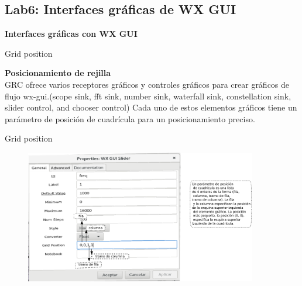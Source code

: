 \subsection{Lab6: Interfaces gráficas de  WX GUI}
\begin{frame}{}


\bfseries{\textrm{\LARGE Interfaces gráficas con \newline WX GUI}}
\raggedright
\end{frame}

\begin{frame}{Grid position}


\textbf {Posicionamiento de rejilla} \\
\vspace{2mm}
GRC ofrece varios receptores gráficos y controles gráficos para crear gráficos de flujo wx-gui.(scope sink, fft sink, number sink, waterfall sink, constellation sink, slider control, and chooser control) Cada uno de estos elementos gráficos tiene un parámetro de posición de cuadrícula para un posicionamiento preciso.

\end{frame}

\begin{frame}{Grid position}

\begin{figure}[H]
\centering
\vspace{-3mm}
\includegraphics[width=0.9\textwidth]{parte1/lab00/pdf/lab0_1.pdf}


\end{figure}

\end{frame}

